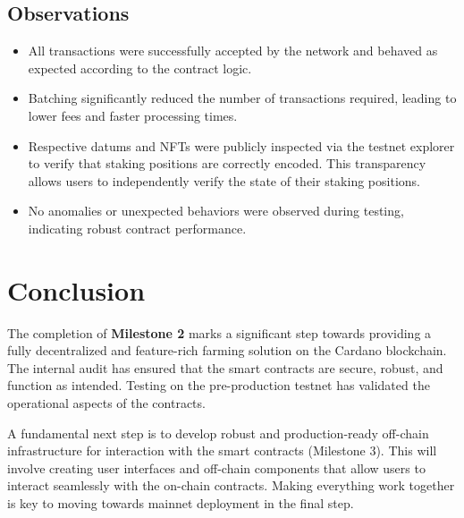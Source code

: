 \documentclass{article}
\begin{document}
\subsection{Observations}

\begin{itemize}
    \item All transactions were successfully accepted by the network and behaved as expected according to the contract logic.
    \item Batching significantly reduced the number of transactions required, leading to lower fees and faster processing times.
    \item Respective datums and NFTs were publicly inspected via the testnet explorer to verify that staking positions are correctly encoded. This transparency allows users to independently verify the state of their staking positions.
    \item No anomalies or unexpected behaviors were observed during testing, indicating robust contract performance.
\end{itemize}

\section{Conclusion}

The completion of \textbf{Milestone 2} marks a significant step towards providing a fully decentralized and feature-rich farming solution on the Cardano blockchain. The internal audit has ensured that the smart contracts are secure, robust, and function as intended. Testing on the pre-production testnet has validated the operational aspects of the contracts.

A fundamental next step is to develop robust and production-ready off-chain infrastructure for interaction with the smart contracts (Milestone 3). This will involve creating user interfaces and off-chain components that allow users to interact seamlessly with the on-chain contracts. Making everything work together is key to moving towards mainnet deployment in the final step.
\end{document}
